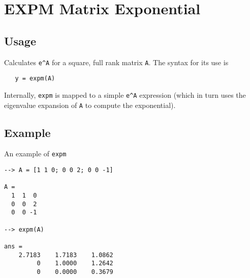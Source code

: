 \section{EXPM Matrix Exponential}

\subsection{Usage}

Calculates \verb|e^A| for a square, full rank matrix \verb|A|.  The
syntax for its use is
\begin{verbatim}
   y = expm(A)
\end{verbatim}
Internally, \verb|expm| is mapped to a simple \verb|e^A| expression (which
in turn uses the eigenvalue expansion of \verb|A| to compute the
exponential).
\subsection{Example}

An example of \verb|expm|
\begin{verbatim}
--> A = [1 1 0; 0 0 2; 0 0 -1]

A = 
  1  1  0 
  0  0  2 
  0  0 -1 

--> expm(A)

ans = 
    2.7183    1.7183    1.0862 
         0    1.0000    1.2642 
         0    0.0000    0.3679 
\end{verbatim}
